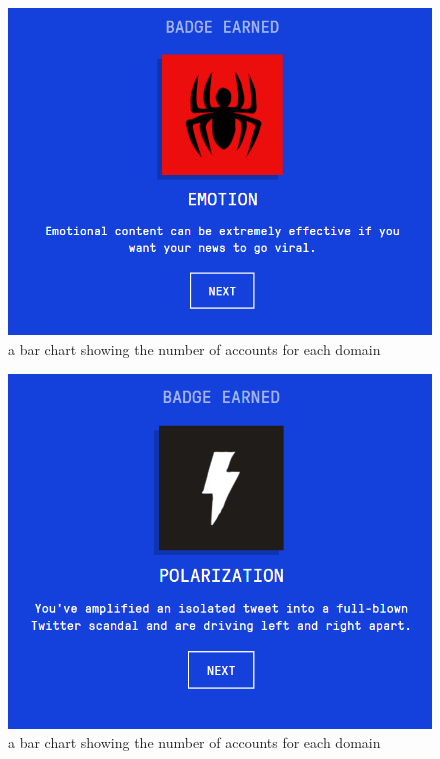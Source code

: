 \documentclass[12pt]{article}
\begin{document}
\begin{figure}[H]
            \centering
            \includegraphics[trim=0 0 0 0, clip, width=\textwidth] {secondBadge.PNG}
            \caption{ a bar chart showing the number of accounts for each domain}
            \label{fig:2}
\end{figure}
\begin{figure}[H]
            \centering
            \includegraphics[trim=0 0 0 0, clip, width=\textwidth] {thirdBadge.PNG}
            \caption{ a bar chart showing the number of accounts for each domain}
            \label{fig:3}
\end{figure}
\end{document}
